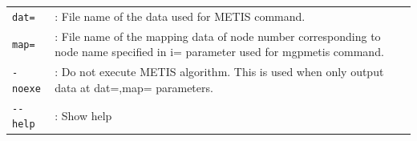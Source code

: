 \begin{table}[htbp]
{\begin{tabular}{ll}
\verb|dat=|   & : File name of the data used for METIS command.  \\
\verb|map=|   & : File name of the mapping data of node number corresponding to node name specified in i= parameter used for mgpmetis command.   \\
\verb|-noexe| & : Do not execute  METIS algorithm. This is used when only output data at dat=,map= parameters.  \\


\verb|--help| & : Show help  \\

\end{tabular} 
}
\end{table} 



